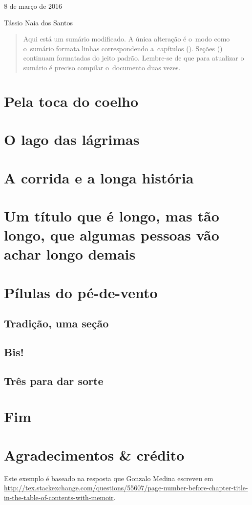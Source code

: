 \documentclass{memoir}
\begin{document}
\hfill 8 de março de 2016

\medskip

\noindent Tássio Naia dos Santos

\medskip

%
%
%


\bigskip

\begin{abstract}
Aqui está um sumário modificado.
A única alteração é o~modo como o~sumário formata linhas 
correspondendo a~capítulos (). 
Seções () continuam formatadas 
do jeito padrão.
Lembre-se de que para atualizar o sumário é preciso compilar
o~documento duas vezes.
\end{abstract}

\tableofcontents*

\chapter{Pela toca do coelho}
\chapter{O lago das lágrimas}
\chapter{A corrida e a longa história}
\setcounter{page}{14}

\chapter{Um título que é longo, mas tão longo, que algumas pessoas vão achar longo demais}
\chapter{Pílulas do pé-de-vento}
\section{Tradição, uma seção}
\section{Bis!}
\section{Três para dar sorte}

\chapter{F\dotfill im}

\chapter*{Agradecimentos \& crédito}

Este exemplo é baseado na resposta que Gonzalo Medina escreveu em \url{http://tex.stackexchange.com/questions/55607/page-number-before-chapter-title-in-the-table-of-contents-with-memoir}.
\end{document}
